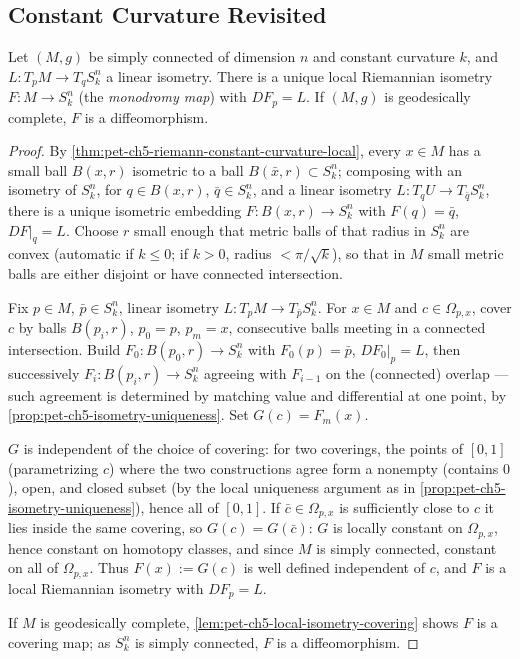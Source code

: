 \subsection{Constant Curvature Revisited}

\begin{theorem}
  \label{thm:pet-ch5-monodromy-theorem}
  Let $(M,g)$ be simply connected of dimension $n$ and constant curvature $k$, and
  $L:T_pM\to T_qS^n_k$ a linear isometry. There is a unique local Riemannian
  isometry $F:M\to S^n_k$ (the \emph{monodromy map}) with $DF_p=L$. If $(M,g)$ is
  geodesically complete, $F$ is a diffeomorphism.
\end{theorem}
\begin{proof}
  By \cref{thm:pet-ch5-riemann-constant-curvature-local}, every $x\in M$ has a small
  ball $B(x,r)$ isometric to a ball $B(\bar x,r)\subset S^n_k$; composing with an
  isometry of $S^n_k$, for $q\in B(x,r)$, $\bar q\in S^n_k$, and a linear isometry
  $L:T_qU\to T_{\bar q}S^n_k$, there is a unique isometric embedding
  $F:B(x,r)\to S^n_k$ with $F(q)=\bar q$, $DF|_q=L$. Choose $r$ small enough that
  metric balls of that radius in $S^n_k$ are convex (automatic if $k\le0$; if
  $k>0$, radius $<\pi/\sqrt k$), so that in $M$ small metric balls are either
  disjoint or have connected intersection.

  Fix $p\in M$, $\bar p\in S^n_k$, linear isometry $L:T_pM\to T_{\bar p}S^n_k$. For
  $x\in M$ and $c\in\Omega_{p,x}$, cover $c$ by balls $B(p_i,r)$, $p_0=p$,
  $p_m=x$, consecutive balls meeting in a connected intersection. Build
  $F_0:B(p_0,r)\to S^n_k$ with $F_0(p)=\bar p$, $DF_0|_p=L$, then successively
  $F_i:B(p_i,r)\to S^n_k$ agreeing with $F_{i-1}$ on the (connected) overlap — such
  agreement is determined by matching value and differential at one point, by
  \cref{prop:pet-ch5-isometry-uniqueness}. Set $G(c)=F_m(x)$.

  $G$ is independent of the choice of covering: for two coverings, the points of
  $[0,1]$ (parametrizing $c$) where the two constructions agree form a nonempty
  (contains $0$), open, and closed subset (by the local uniqueness argument as in
  \cref{prop:pet-ch5-isometry-uniqueness}), hence all of $[0,1]$. If
  $\bar c\in\Omega_{p,x}$ is sufficiently close to $c$ it lies inside the same
  covering, so $G(c)=G(\bar c)$: $G$ is locally constant on $\Omega_{p,x}$, hence
  constant on homotopy classes, and since $M$ is simply connected, constant on all
  of $\Omega_{p,x}$. Thus $F(x):=G(c)$ is well defined independent of $c$, and $F$
  is a local Riemannian isometry with $DF_p=L$.

  If $M$ is geodesically complete, \cref{lem:pet-ch5-local-isometry-covering} shows
  $F$ is a covering map; as $S^n_k$ is simply connected, $F$ is a diffeomorphism.
\end{proof}

